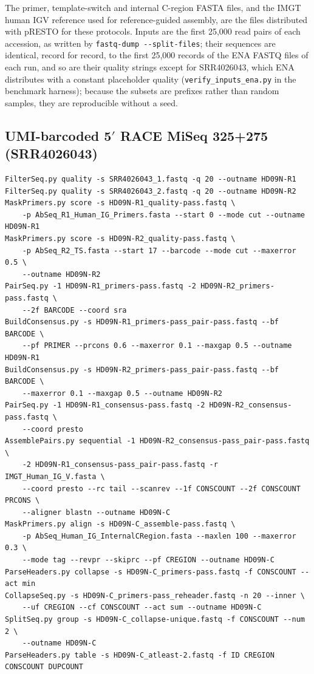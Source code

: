 \documentclass[11pt]{article}
\begin{document}
The primer, template-switch and internal C-region FASTA files, and the IMGT
human IGV reference used for reference-guided assembly, are the files
distributed with pRESTO for these protocols. Inputs are the first 25,000 read
pairs of each accession, as written by \texttt{fastq-dump -{}-split-files};
their sequences are identical, record for record, to the first 25,000 records
of the ENA FASTQ files of each run, and so are their quality strings except for
SRR4026043, which ENA distributes with a constant placeholder quality
(\texttt{verify\_inputs\_ena.py} in the benchmark harness);
because the subsets are prefixes rather than random samples, they are
reproducible without a seed.

\subsection*{UMI-barcoded 5$'$ RACE MiSeq 325+275 (SRR4026043)}

\small
\begin{verbatim}
FilterSeq.py quality -s SRR4026043_1.fastq -q 20 --outname HD09N-R1
FilterSeq.py quality -s SRR4026043_2.fastq -q 20 --outname HD09N-R2
MaskPrimers.py score -s HD09N-R1_quality-pass.fastq \
    -p AbSeq_R1_Human_IG_Primers.fasta --start 0 --mode cut --outname HD09N-R1
MaskPrimers.py score -s HD09N-R2_quality-pass.fastq \
    -p AbSeq_R2_TS.fasta --start 17 --barcode --mode cut --maxerror 0.5 \
    --outname HD09N-R2
PairSeq.py -1 HD09N-R1_primers-pass.fastq -2 HD09N-R2_primers-pass.fastq \
    --2f BARCODE --coord sra
BuildConsensus.py -s HD09N-R1_primers-pass_pair-pass.fastq --bf BARCODE \
    --pf PRIMER --prcons 0.6 --maxerror 0.1 --maxgap 0.5 --outname HD09N-R1
BuildConsensus.py -s HD09N-R2_primers-pass_pair-pass.fastq --bf BARCODE \
    --maxerror 0.1 --maxgap 0.5 --outname HD09N-R2
PairSeq.py -1 HD09N-R1_consensus-pass.fastq -2 HD09N-R2_consensus-pass.fastq \
    --coord presto
AssemblePairs.py sequential -1 HD09N-R2_consensus-pass_pair-pass.fastq \
    -2 HD09N-R1_consensus-pass_pair-pass.fastq -r IMGT_Human_IG_V.fasta \
    --coord presto --rc tail --scanrev --1f CONSCOUNT --2f CONSCOUNT PRCONS \
    --aligner blastn --outname HD09N-C
MaskPrimers.py align -s HD09N-C_assemble-pass.fastq \
    -p AbSeq_Human_IG_InternalCRegion.fasta --maxlen 100 --maxerror 0.3 \
    --mode tag --revpr --skiprc --pf CREGION --outname HD09N-C
ParseHeaders.py collapse -s HD09N-C_primers-pass.fastq -f CONSCOUNT --act min
CollapseSeq.py -s HD09N-C_primers-pass_reheader.fastq -n 20 --inner \
    --uf CREGION --cf CONSCOUNT --act sum --outname HD09N-C
SplitSeq.py group -s HD09N-C_collapse-unique.fastq -f CONSCOUNT --num 2 \
    --outname HD09N-C
ParseHeaders.py table -s HD09N-C_atleast-2.fastq -f ID CREGION CONSCOUNT DUPCOUNT
\end{verbatim}
\normalsize
\end{document}
